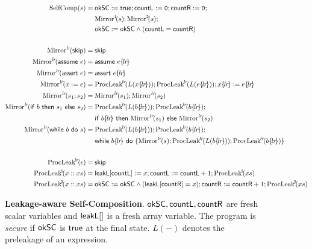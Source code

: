 \documentclass{llncs}
\newcommand{\wassign}[2]{#1 := #2}
\newcommand{\wskip}{\mathsf{skip}}
\newcommand{\wseq}[2]{{#1};{#2}}
\newcommand{\wwhile}[2]{\mathsf{while}\ {#1}\ \mathsf{do}\ {#2}}
\newcommand{\wif}[3]{\mathsf{if\ }#1\ \mathsf{then}\ #2\ \mathsf{else}\ #3}
\newcommand{\wassert}[1]{\mathsf{assert}~#1}
\newcommand{\wassume}[1]{\mathsf{assume}~#1}
\begin{document}
\begin{figure}[thb]
  \centering
  \begin{align*}
    \SelfComp{s} &= \wseq{\wassign{\oksc}{\ett}}{\wseq{\wassign{\countL}{\mathtt{0}}}{\wassign{\countR}{\mathtt{0}}}}; \\
    &\quad\ \wseq{\Mirror{\sideL}{s}}{\Mirror{\sideR}{s}}; \\
    &\quad\ \checkL{\oksc}{\countL}{\countR} \\
    & \\
    \Mirror{\vside}{\wskip} &= \wskip \\
    \Mirror{\vside}{\wassume{e}} &= \wassume{\side{\vside}{e}} \\
    \Mirror{\vside}{\wassert{e}} &= \wassert{\side{\vside}{e}} \\
    \Mirror{\vside}{\wassign{x}{e}} &= \wseq{\wseq{\RecLeak{\vside}{L(\side{\vside}{x})}}{\RecLeak{\vside}{L(\side{\vside}{e})}}}
                                            {\wassign{\side{\vside}{x}}{\side{\vside}{e}}} \\
    \Mirror{\vside}{\wseq{s_1}{s_2}} &= \wseq{\Mirror{\vside}{s_1}}{\Mirror{\vside}{s_2}} \\
    \Mirror{\vside}{\wif{b}{s_1}{s_2}} &= \wseq{\RecLeak{\vside}{L(\side{\vside}{b})}}{\RecLeak{\vside}{\side{\vside}{b}}}; \\
    &\quad\ \wif{\side{\vside}{b}}{\Mirror{\vside}{s_1}}{\Mirror{\vside}{s_2}} \\
    \Mirror{\vside}{\wwhile{b}{s}} &= \wseq{\RecLeak{\vside}{L(\side{\vside}{b})}}{\RecLeak{\vside}{\side{\vside}{b}}}; \\
    &\quad\ \wwhile{\side{\vside}{b}}{\{\wseq{\Mirror{\vside}{s}}
                                             {\wseq{\RecLeak{\vside}{L(\side{\vside}{b})}}{\RecLeak{\vside}{\side{\vside}{b}}}}\}} \\
    & \\
    \RecLeak{\vside}{\nil} &= \wskip \\
    \RecLeak{\sideL}{\cons{x}{xs}} &= \wseq{\wseq{\recordL{\countL}{x}}{\wassign{\countL}{\countL+1}}}
                                   {\RecLeak{\sideL}{xs}} \\
    \RecLeak{\sideR}{\cons{x}{xs}} &= \wseq{\wseq{\checkL{\oksc}{\leakL{\countR}}{x}}{\wassign{\countR}{\countR+1}}}
                                   {\RecLeak{\sideR}{xs}} \\
  \end{align*}
  \caption{\textbf{Leakage-aware Self-Composition}.
    $\mathsf{okSC}, \mathsf{countL}, \mathsf{countR}$ are fresh scalar variables and $\leakL$
    is a fresh array variable. The program is \emph{secure} if $\mathsf{okSC}$
    is $\mathsf{true}$ at the final state. $L(-)$ denotes the preleakage of an
    expression.}
  \label{fig:self-comp}
\end{figure}
\end{document}
